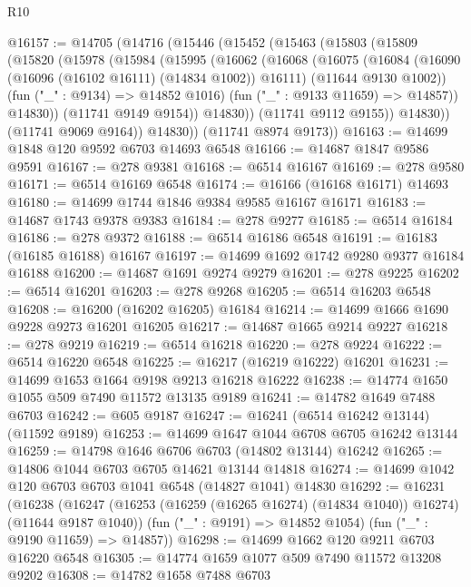 \begin{lexlean}{R10}
\begin{coremodule}
{{{{{{{{{{{{{{{{{{{{{{{{{{{{{{{{{{{{{{{{{{{{{{{{{{{{{{{{{{{{{{{{{{{{{{{{{{{{{{{{{{{{@16157 := @14705
    (@14716
      (@15446
        (@15452
          (@15463
            (@15803
              (@15809
                (@15820
                  (@15978
                    (@15984
                      (@15995
                        (@16062
                          (@16068
                            (@16075
                              (@16084
                                (@16090 (@16096 (@16102 @16111) (@14834 @1002)) @16111)
                                (@11644 @9130 @1002))
                              (fun ("_" : @9134) => @14852 @1016)
                              (fun ("_" : @9133 @11659) => @14857))
                            @14830))
                        (@11741 @9149 @9154))
                      @14830))
                  (@11741 @9112 @9155))
                @14830))
            (@11741 @9069 @9164))
          @14830))
      (@11741 @8974 @9173))
@16163 := @14699 @1848 @120 @9592 @6703 @14693 @6548
@16166 := @14687 @1847 @9586 @9591
@16167 := @278 @9381
@16168 := @6514 @16167
@16169 := @278 @9580
@16171 := @6514 @16169 @6548
@16174 := @16166 (@16168 @16171) @14693
@16180 := @14699 @1744 @1846 @9384 @9585 @16167 @16171
@16183 := @14687 @1743 @9378 @9383
@16184 := @278 @9277
@16185 := @6514 @16184
@16186 := @278 @9372
@16188 := @6514 @16186 @6548
@16191 := @16183 (@16185 @16188) @16167
@16197 := @14699 @1692 @1742 @9280 @9377 @16184 @16188
@16200 := @14687 @1691 @9274 @9279
@16201 := @278 @9225
@16202 := @6514 @16201
@16203 := @278 @9268
@16205 := @6514 @16203 @6548
@16208 := @16200 (@16202 @16205) @16184
@16214 := @14699 @1666 @1690 @9228 @9273 @16201 @16205
@16217 := @14687 @1665 @9214 @9227
@16218 := @278 @9219
@16219 := @6514 @16218
@16220 := @278 @9224
@16222 := @6514 @16220 @6548
@16225 := @16217 (@16219 @16222) @16201
@16231 := @14699 @1653 @1664 @9198 @9213 @16218 @16222
@16238 := @14774 @1650 @1055 @509 @7490 @11572 @13135 @9189
@16241 := @14782 @1649 @7488 @6703
@16242 := @605 @9187
@16247 := @16241 (@6514 @16242 @13144) (@11592 @9189)
@16253 := @14699 @1647 @1044 @6708 @6705 @16242 @13144
@16259 := @14798 @1646 @6706 @6703 (@14802 @13144) @16242
@16265 := @14806 @1044 @6703 @6705 @14621 @13144 @14818
@16274 := @14699 @1042 @120 @6703 @6703 @1041 @6548 (@14827 @1041) @14830
@16292 := @16231
    (@16238
      (@16247 (@16253 (@16259 (@16265 @16274) (@14834 @1040)) @16274) (@11644 @9187 @1040))
      (fun ("_" : @9191) => @14852 @1054)
      (fun ("_" : @9190 @11659) => @14857))
@16298 := @14699 @1662 @120 @9211 @6703 @16220 @6548
@16305 := @14774 @1659 @1077 @509 @7490 @11572 @13208 @9202
@16308 := @14782 @1658 @7488 @6703
}}}}}}}}}}}}}}}}}}}}}}}}}}}}}}}}}}}}}}}}}}}}}}}}}}}}}}}}}}}}}}}}}}}}}}}}}}}}}}}}}}}}
\end{coremodule}
\end{lexlean}
